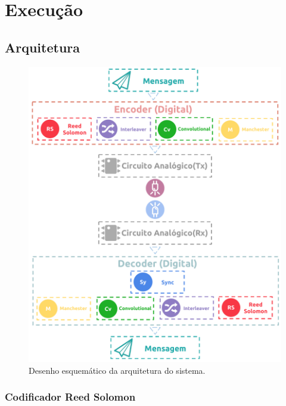 	\chapter{Execução}\label{cap-execucao}
	
	\section{Arquitetura}
	
	\begin{figure}[htb]
		\caption{\label{fig_arch}Desenho esquemático da arquitetura do sistema.}
		\centering
		\includegraphics[width=1\textwidth]{Arquitetura.pdf}
	\end{figure}
	
	\subsection{Codificador Reed Solomon}
	
